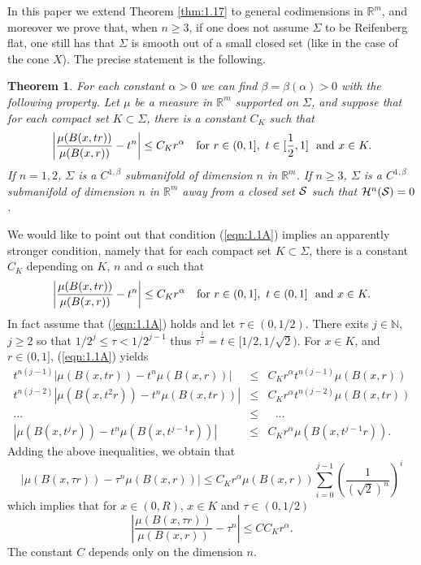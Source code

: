 \documentclass[12pt,leqno]{article}
\newcommand{\RR}{\mathbb{R}}
\newcommand{\NN}{\mathbb{N}}
\theoremstyle{plain}
\newtheorem{thm}{Theorem}[section]
\numberwithin{equation}{section}
\begin{document}
In this paper we extend Theorem \ref{thm:1.17} to general codimensions in
$\RR^m$, and moreover we prove that, when $n\geq3$, if one does not assume $\Sigma$ to be Reifenberg flat,
one still has that $\Sigma$ is smooth out of a small closed set (like in the case of the cone $X$). The precise
statement is the following.


\begin{thm}\label{thm:1.17A}
For each constant $\alpha>0$ we can find $\beta=\beta(\alpha)>0$ with the
following property. Let $\mu$ be a measure in $\RR^{m}$ supported on
$\Sigma$, and suppose that for each compact set
$K\subset\Sigma$, there is a constant $C_K$ such that
\begin{equation}\label{eqn:1.1A}
\left|\frac{\mu(B(x,tr))}{\mu(B(x,r))} - t^n\right|\le
C_Kr^\alpha \ \ \ \hbox{for}\
r\in (0,1],\ t\in[\frac{1}{2},1]\ \hbox{ and}\  x\in K.
\end{equation}
If $n=1,2$, $\Sigma$ is
a $C^{1,\beta}$ submanifold of dimension $n$ in $\RR^{m}$.
If $n\ge 3$, $\Sigma$ is a $C^{1,\beta}$ submanifold of dimension $n$
in $\RR^{m}$ away from a closed set ${\cal S}$ such that
${\cal H}^n({\cal S})=0$.
\end{thm}





\noindent We would like to point out that condition (\ref{eqn:1.1A}) implies an
apparently stronger condition, namely that for each compact set
$K\subset\Sigma$, there is a constant $C_K$ depending on
$K$, $n$ and $\alpha$ such that
\begin{equation}\label{eqn:1.100}
\left|\frac{\mu(B(x,tr))}{\mu(B(x,r))} - t^n\right|\le
C_Kr^\alpha \ \ \ \hbox{for}\
r\in (0,1],\ t\in (0,1]\ \hbox{ and}\  x\in K.
\end{equation}
In fact assume that (\ref{eqn:1.1A}) holds
and let $\tau\in (0,1/2) $. There exits
$j\in\NN $, $j\ge 2$ so that $1/2^{j}\le \tau <1/2^{j-1}$ thus
$\tau^{\frac{1}{j}}=t\in [1/2,1/\sqrt{2})$. For $x\in K$, and
$r\in (0,1]$, (\ref{eqn:1.1A})
yields
\begin{eqnarray}\label{eqn:1.101}
t^{n(j-1)}\left|\mu(B(x,tr))-t^{n}\mu(B(x,r))\right|&\le & C_Kr^\alpha
t^{n(j-1)} \mu(B(x,r))\\
t^{n(j-2)}\left|\mu(B(x,t^{2}r))-t^{n}\mu(B(x,tr))\right|&\le & C_Kr^\alpha
t^{n(j-2)}
\mu(B(x,tr))\nonumber\\
...\ \ \ &\le & \ \ \ ...\nonumber\\
\left|\mu(B(x,t^{j}r))-t^{n}\mu(B(x,t^{j-1}r))\right|&\le &
C_Kr^\alpha \mu(B(x,t^{j-1}r)).\nonumber
\end{eqnarray}
Adding the above inequalities, we obtain that
\begin{equation}\label{eqn:1.101b}
\left|\mu(B(x,\tau r))-\tau^{n}\mu(B(x,r))\right|\le  C_Kr^\alpha
\mu(B(x,r))\sum_{i=0}^{j-1}
\left(\frac{1}{(\sqrt{2})^n}\right)^{i}
\end{equation}
which implies that for $x\in (0,R)$, $x\in K$ and $\tau\in(0, {1/2})$
\begin{equation}\label{eqn:1.102}
\left|\frac{\mu(B(x,\tau r))}{\mu(B(x,r))}-\tau^{n}\right| \le
CC_Kr^\alpha.
\end{equation}
The constant $C$ depends only on the dimension $n$.
\end{document}
